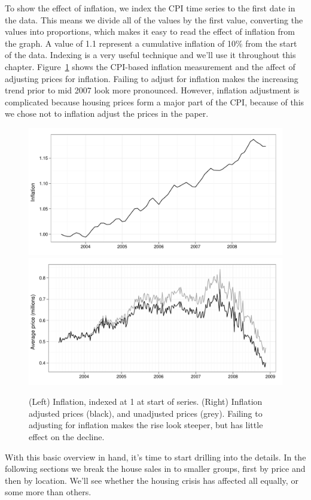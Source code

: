 \documentclass[oneside]{article}
\begin{document}
% 

To show the effect of inflation, we index the CPI time series to the first date in the data.  This means we divide all of the values by the first value, converting the values into proportions, which makes it easy to read the effect of inflation from the graph.  A value of 1.1 represent a cumulative inflation of 10\% from the start of the data.  Indexing is a very useful technique and we'll use it throughout this chapter.  Figure~\ref{fig:inflation} shows the CPI-based inflation measurement and the affect of adjusting prices for inflation.  Failing to adjust for inflation makes the increasing trend prior to mid 2007 look more pronounced.  However, inflation adjustment is complicated because housing prices form a major part of the CPI, because of this we chose not to inflation adjust the prices in the paper.

\begin{figure}[htbp]
  \centering
    \includegraphics[width=0.5 \linewidth]{daily-cpi}%
    \includegraphics[width=0.5 \linewidth]{daily-price-adj}
  \caption{(Left) Inflation, indexed at 1 at start of series.  (Right) Inflation adjusted prices (black), and unadjusted prices (grey).  Failing to adjusting for inflation makes the rise look steeper, but has little effect on the decline.}
  \label{fig:inflation}
\end{figure}

With this basic overview in hand, it's time to start drilling into the details. In the following sections we break the house sales in to smaller groups, first by price and then by location.  We'll see whether the housing crisis has affected all equally, or some more than others.
\end{document}
